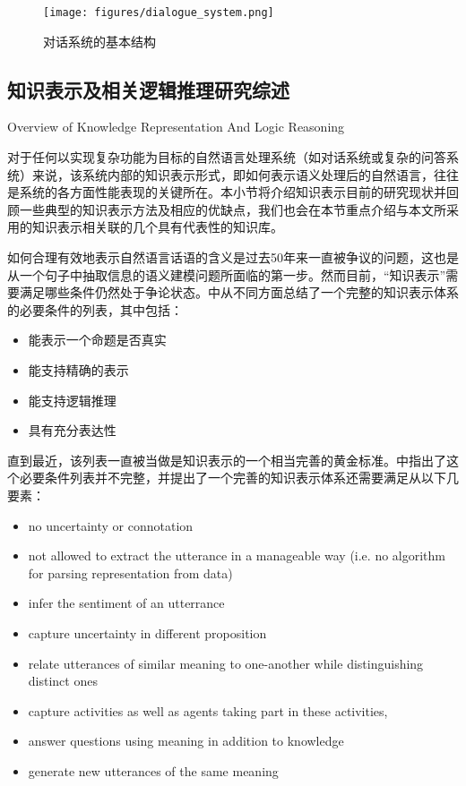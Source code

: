 \begin{figure}[htb]
\centering
\texttt{[image: figures/dialogue\_system.png]}
\caption{对话系统的基本结构}
\label{fig:dialogue}
\end{figure}


\subsection{知识表示及相关逻辑推理研究综述}{Overview of Knowledge Representation And Logic Reasoning}
\label{sec:representationReview}

对于任何以实现复杂功能为目标的自然语言处理系统（如对话系统或复杂的问答系统）来说，该系统内部的知识表示形式，即如何表示语义处理后的自然语言，往往是系统的各方面性能表现的关键所在。本小节将介绍知识表示目前的研究现状并回顾一些典型的知识表示方法及相应的优缺点，我们也会在本节重点介绍与本文所采用的知识表示相关联的几个具有代表性的知识库。

如何合理有效地表示自然语言话语的含义是过去50年来一直被争议的问题，这也是从一个句子中抽取信息的语义建模问题所面临的第一步。然而目前，“知识表示”需要满足哪些条件仍然处于争论状态。\cite{Jurafsky2009}中从不同方面总结了一个完整的知识表示体系的必要条件的列表，其中包括：

\begin{itemize}
\item 能表示一个命题是否真实
\item 能支持精确的表示
\item 能支持逻辑推理
\item 具有充分表达性
\end{itemize}

直到最近，该列表一直被当做是知识表示的一个相当完善的黄金标准。\cite{Yarin2013}中指出了这个必要条件列表并不完整，并提出了一个完善的知识表示体系还需要满足从以下几要素：

\begin{itemize}
\item no uncertainty or connotation
\item not allowed to extract the utterance in a manageable way (i.e. no algorithm for parsing representation from data)
\item infer the sentiment of an utterrance
\item capture uncertainty in different proposition
\item relate utterances of similar meaning to one-another while distinguishing distinct ones
\item capture activities as well as agents taking part in these activities,
\item answer questions using meaning in addition to knowledge
\item generate new utterances of the same meaning
\end{itemize}



